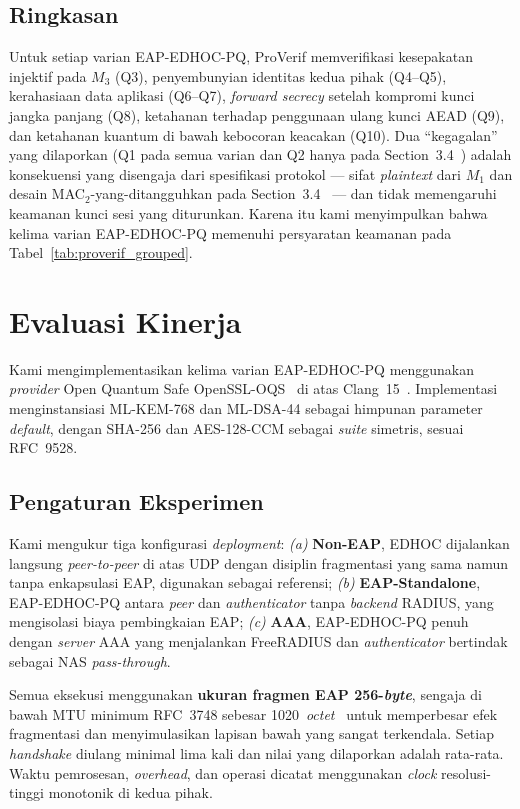\documentclass{easychair}
\newcommand{\VarSec}[1]{Section~#1~\cite{pq-edhoc-draft}}
\begin{document}
\subsection{Ringkasan}
Untuk setiap varian EAP-EDHOC-PQ, ProVerif memverifikasi kesepakatan
injektif pada $M_3$ (Q3), penyembunyian identitas kedua pihak
(Q4--Q5), kerahasiaan data aplikasi (Q6--Q7), \emph{forward secrecy}
setelah kompromi kunci jangka panjang (Q8), ketahanan terhadap
penggunaan ulang kunci AEAD (Q9), dan ketahanan kuantum di bawah
kebocoran keacakan (Q10). Dua ``kegagalan'' yang dilaporkan (Q1 pada
semua varian dan Q2 hanya pada \VarSec{3.4}) adalah konsekuensi yang
disengaja dari spesifikasi protokol --- sifat \emph{plaintext} dari
$M_1$ dan desain MAC$_2$-yang-ditangguhkan pada \VarSec{3.4} ---
dan tidak memengaruhi keamanan kunci sesi yang diturunkan. Karena
itu kami menyimpulkan bahwa kelima varian EAP-EDHOC-PQ memenuhi
persyaratan keamanan pada Tabel~\ref{tab:proverif_grouped}.


\section{Evaluasi Kinerja}
\label{performance-evaluation}
Kami mengimplementasikan kelima varian EAP-EDHOC-PQ menggunakan
\emph{provider} Open Quantum Safe OpenSSL-OQS~\cite{openssl_oqs} di
atas Clang~15~\cite{clang15}. Implementasi menginstansiasi ML-KEM-768
dan ML-DSA-44 sebagai himpunan parameter \emph{default}, dengan
SHA-256 dan AES-128-CCM sebagai \emph{suite} simetris, sesuai
RFC~9528.

\subsection{Pengaturan Eksperimen}
Kami mengukur tiga konfigurasi \emph{deployment}:
\emph{(a)} \textbf{Non-EAP}, EDHOC dijalankan langsung
\emph{peer-to-peer} di atas UDP dengan disiplin fragmentasi yang sama
namun tanpa enkapsulasi EAP, digunakan sebagai referensi;
\emph{(b)} \textbf{EAP-Standalone}, EAP-EDHOC-PQ antara \emph{peer}
dan \emph{authenticator} tanpa \emph{backend} RADIUS, yang mengisolasi
biaya pembingkaian EAP;
\emph{(c)} \textbf{AAA}, EAP-EDHOC-PQ penuh dengan \emph{server} AAA
yang menjalankan FreeRADIUS dan \emph{authenticator} bertindak sebagai
NAS \emph{pass-through}.

Semua eksekusi menggunakan \textbf{ukuran fragmen EAP 256-\emph{byte}},
sengaja di bawah MTU minimum RFC~3748 sebesar 1020~\emph{octet}~\cite{RFC3748,RFC9191}
untuk memperbesar efek fragmentasi dan menyimulasikan lapisan bawah
yang sangat terkendala. Setiap \emph{handshake} diulang minimal lima
kali dan nilai yang dilaporkan adalah rata-rata. Waktu pemrosesan,
\emph{overhead}, dan operasi dicatat menggunakan \emph{clock}
resolusi-tinggi monotonik di kedua pihak.
\end{document}
